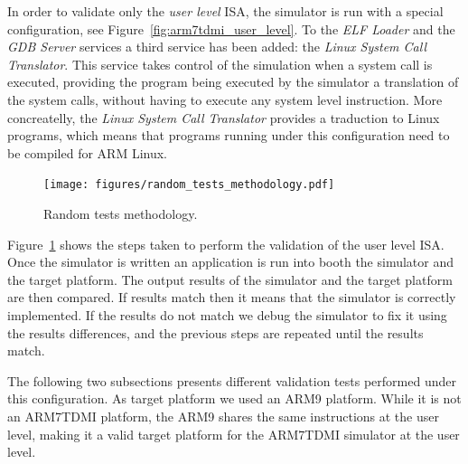 In order to validate only the \emph{user level} ISA, the simulator is run with a special configuration, see Figure~\ref{fig:arm7tdmi_user_level}.
To the \emph{ELF Loader} and the \emph{GDB Server} services a third service has been added: the \emph{Linux System Call Translator}.
This service takes control of the simulation when a system call is executed, providing the program being executed by the simulator a translation of the system calls, without having to execute any system level instruction.
More concreatelly, the \emph{Linux System Call Translator} provides a traduction to Linux programs, which means that programs running under this configuration need to be compiled for ARM Linux.

\begin{figure}[!h]
	\begin{center}
		\texttt{[image: figures/random\_tests\_methodology.pdf]}
	\end{center}
	\caption{Random tests methodology.}
	\label{fig:random_tests_methodology}
\end{figure}

Figure~\ref{fig:random_tests_methodology} shows the steps taken to perform the validation of the user level ISA.
Once the simulator is written an application is run into booth the simulator and the target platform.
The output results of the simulator and the target platform are then compared.
If results match then it means that the simulator is correctly implemented.
If the results do not match we debug the simulator to fix it using the results differences, and the previous steps are repeated until the results match.

The following two subsections presents different validation tests performed under this configuration.
As target platform we used an ARM9 platform.
While it is not an ARM7TDMI platform, the ARM9 shares the same instructions at the user level, making it a valid target platform for the ARM7TDMI simulator at the user level.





